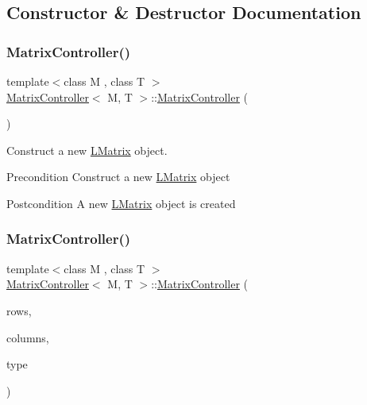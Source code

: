 \subsection{Constructor \& Destructor Documentation}
\mbox{\label{class_matrix_controller_ad3e161e9dfa785fc9e9007b12d79a834}} 
\subsubsection{\texorpdfstring{MatrixController()}{MatrixController()}\hspace{0.1cm}{\footnotesize\ttfamily [1/3]}}
{\footnotesize\ttfamily template$<$class M , class T $>$ \\
\mbox{\hyperlink{class_matrix_controller}{Matrix\+Controller}}$<$ M, T $>$\+::\mbox{\hyperlink{class_matrix_controller}{Matrix\+Controller}} (\begin{DoxyParamCaption}{ }\end{DoxyParamCaption})}



Construct a new \mbox{\hyperlink{class_l_matrix}{L\+Matrix}} object. 

\begin{DoxyPrecond}{Precondition}
Construct a new \mbox{\hyperlink{class_l_matrix}{L\+Matrix}} object 
\end{DoxyPrecond}
\begin{DoxyPostcond}{Postcondition}
A new \mbox{\hyperlink{class_l_matrix}{L\+Matrix}} object is created 
\end{DoxyPostcond}
\mbox{\label{class_matrix_controller_adf5ba28c2f4fe911479ccccf8381823d}} 
\subsubsection{\texorpdfstring{MatrixController()}{MatrixController()}\hspace{0.1cm}{\footnotesize\ttfamily [2/3]}}
{\footnotesize\ttfamily template$<$class M , class T $>$ \\
\mbox{\hyperlink{class_matrix_controller}{Matrix\+Controller}}$<$ M, T $>$\+::\mbox{\hyperlink{class_matrix_controller}{Matrix\+Controller}} (\begin{DoxyParamCaption}\item[{int}]{rows,  }\item[{int}]{columns,  }\item[{\mbox{\hyperlink{class_matrix_controller_aca66836084cbc7807dbaea879ac31fc7}{type\+Enum}}}]{type }\end{DoxyParamCaption})}



